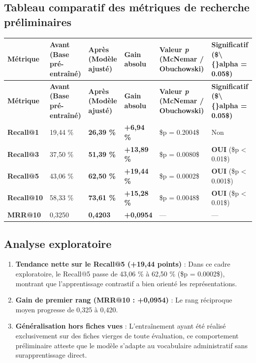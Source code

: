 \documentclass[11pt,a4paper]{article}
\newcommand{\rulebreak}{}
\newcommand{\thead}[1]{{\tabfont\bfseries\color{accent}\hspace{0pt}#1}}
\newenvironment{tabletype}
  {\par\addvspace{7pt}\begingroup
   \tabfont\setlength{\tabcolsep}{4pt}\renewcommand{\arraystretch}{1.26}
   \setlength{\LTleft}{0pt}\setlength{\LTright}{0pt}
   \setlength{\extrarowheight}{1pt}
   \hyphenpenalty=9000\exhyphenpenalty=9000
   \emergencystretch=0pt\hbadness=10000\relax}
  {\endgroup\par\addvspace{9pt}}
\newlength{\tw}\setlength{\tw}{\textwidth}
\newcommand{\settw}[1]{\setlength{\tw}{\dimexpr\textwidth-#1pt\relax}}
\begin{document}
\subsection{Tableau comparatif des métriques de recherche préliminaires}
\begin{tabletype}
\scriptsize
\settw{40.0}
\setlength{\LTpre}{0pt}\setlength{\LTpost}{0pt}
\begin{longtable}{@{}L{0.08954\tw}L{0.18629\tw}L{0.16005\tw}L{0.09708\tw}L{0.23549\tw}L{0.23155\tw}@{}}
\toprule
\thead{Métrique} & \thead{Avant (Base pré-entraîné)} & \thead{Après (Modèle ajusté)} & \thead{Gain absolu} & \thead{Valeur \textit{p} (McNemar / Obuchowski)} & \thead{Significatif (\$\textbackslash\{\}alpha = 0.05\$)} \\
\midrule
\endfirsthead
\toprule
\thead{Métrique} & \thead{Avant (Base pré-entraîné)} & \thead{Après (Modèle ajusté)} & \thead{Gain absolu} & \thead{Valeur \textit{p} (McNemar / Obuchowski)} & \thead{Significatif (\$\textbackslash\{\}alpha = 0.05\$)} \\
\midrule
\endhead
\bottomrule
\endfoot
\bottomrule
\endlastfoot
\textbf{Recall@1} & 19,44 \% & \textbf{26,39 \%} & \textbf{+6,94 \%} & \$p = 0.2004\$ & Non \\
\textbf{Recall@3} & 37,50 \% & \textbf{51,39 \%} & \textbf{+13,89 \%} & \$p = 0.0080\$ & \textbf{OUI} (\$p < 0.01\$) \\
\textbf{Recall@5} & 43,06 \% & \textbf{62,50 \%} & \textbf{+19,44 \%} & \$p = 0.0002\$ & \textbf{OUI} (\$p < 0.001\$) \\
\textbf{Recall@10} & 58,33 \% & \textbf{73,61 \%} & \textbf{+15,28 \%} & \$p = 0.0048\$ & \textbf{OUI} (\$p < 0.01\$) \\
\textbf{MRR@10} & 0,3250 & \textbf{0,4203} & \textbf{+0,0954} & — & — \\
\end{longtable}
\end{tabletype}

\subsection{Analyse exploratoire}
\begin{enumerate}
\item \textbf{Tendance nette sur le Recall@5 (+19,44 points)} :   Dans ce cadre exploratoire, le Recall@5 passe de 43,06 \% à 62,50 \% (\$p = 0.0002\$), montrant que l'apprentissage contrastif a bien orienté les représentations.
\item \textbf{Gain de premier rang (MRR@10 : +0,0954)} :   Le rang réciproque moyen progresse de 0,325 à 0,420.
\item \textbf{Généralisation hors fiches vues} :   L'entraînement ayant été réalisé exclusivement sur des fiches vierges de toute évaluation, ce comportement préliminaire atteste que le modèle s'adapte au vocabulaire administratif sans surapprentissage direct.
\end{enumerate}
\rulebreak
\end{document}
